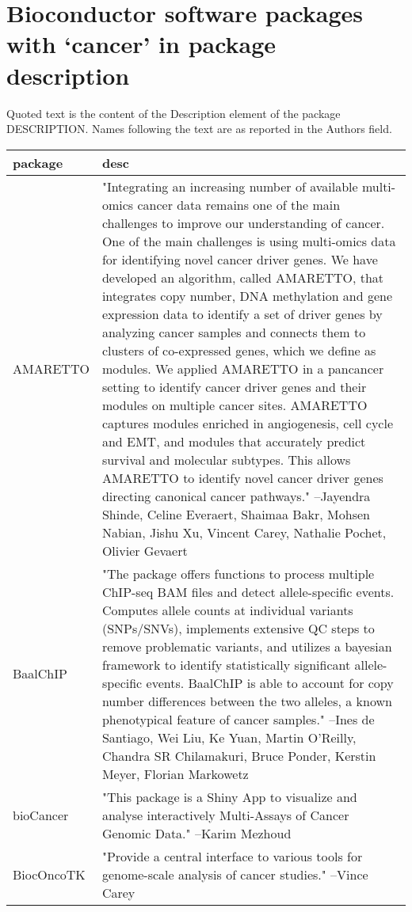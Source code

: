 \section{Bioconductor software packages with `cancer' in package description}\label{app1}

Quoted text is the content of the Description element of the package DESCRIPTION. Names following the
text are as reported in the Authors field.

\begin{longtable}[t]{l>{\raggedright\arraybackslash}p{25em}}
\toprule
package & desc\\
\midrule
AMARETTO & "Integrating an increasing number of available multi-omics
cancer data remains one of the main challenges to improve our
understanding of cancer. One of the main challenges is using
multi-omics data for identifying novel cancer driver genes. We
have developed an algorithm, called AMARETTO, that integrates
copy number, DNA methylation and gene expression data to
identify a set of driver genes by analyzing cancer samples and
connects them to clusters of co-expressed genes, which we
define as modules. We applied AMARETTO in a pancancer setting
to identify cancer driver genes and their modules on multiple
cancer sites. AMARETTO captures modules enriched in
angiogenesis, cell cycle and EMT, and modules that accurately
predict survival and molecular subtypes. This allows AMARETTO
to identify novel cancer driver genes directing canonical
cancer pathways." --Jayendra Shinde, Celine Everaert, Shaimaa Bakr, Mohsen Nabian, Jishu Xu, Vincent Carey, Nathalie Pochet, Olivier Gevaert\\
BaalChIP & "The package offers functions to process multiple ChIP-seq
BAM files and detect allele-specific events. Computes allele
counts at individual variants (SNPs/SNVs), implements extensive
QC steps to remove problematic variants, and utilizes a
bayesian framework to identify statistically significant
allele- specific events. BaalChIP is able to account for copy
number differences between the two alleles, a known
phenotypical feature of cancer samples." --Ines de Santiago, Wei Liu, Ke Yuan, Martin O'Reilly, Chandra SR Chilamakuri, Bruce Ponder, Kerstin Meyer, Florian Markowetz\\
bioCancer & "This package is a Shiny App to visualize and analyse
interactively Multi-Assays of Cancer Genomic Data." --Karim Mezhoud\\
BiocOncoTK & "Provide a central interface to various tools for
genome-scale analysis of cancer studies." --Vince Carey\\

\end{longtable}
